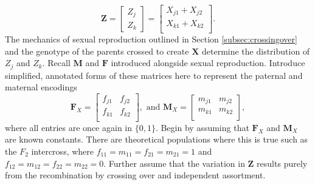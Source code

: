 \documentclass{article}
\newcommand{\ve}[1]{\mathbf{#1}}           %
\newcommand{\m}[1]{\mathbf{#1}}               %
\begin{document}
$$\ve{Z} = \begin{bmatrix} Z_j \\ Z_k \end{bmatrix} = \begin{bmatrix}
  X_{j1} + X_{j2} \\
  X_{k1} + X_{k2} \\
\end{bmatrix}.$$
The mechanics of sexual reproduction outlined in Section \ref{subsec:crossingover} and the genotype of the parents crossed to create $\m{X}$ determine the distribution of $Z_j$ and $Z_k$. Recall $\m{M}$ and $\m{F}$ introduced alongside sexual reproduction. Introduce simplified, annotated forms of these matrices here to represent the paternal and maternal encodings
$$\m{F}_X = \begin{bmatrix}
  f_{j1} & f_{j2} \\
  f_{k1} & f_{k2} \\
\end{bmatrix}, \text{ and }
\m{M}_X = \begin{bmatrix}
  m_{j1} & m_{j2} \\
  m_{k1} & m_{k2} \\
\end{bmatrix},$$
where all entries are once again in $\{0,1\}$. Begin by assuming that $\m{F}_X$ and $\m{M}_X$ are known constants. There are theoretical populations where this is true such as the $F_2$ intercross, where $f_{11} = m_{11} = f_{21} = m_{21} = 1$ and $f_{12} = m_{12} = f_{22} = m_{22} = 0$. Further assume that the variation in $\ve{Z}$ results purely from the recombination by crossing over and independent assortment.
\end{document}
